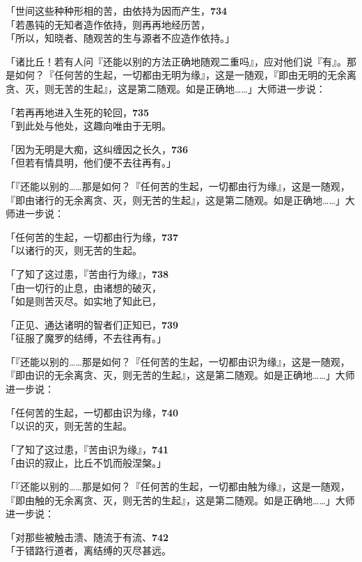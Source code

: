 「世间这些种种形相的苦，由依持为因而产生，\hfill{\grayfootnotesize \textbf{734}} \\
「若愚钝的无知者造作依持，则再再地经历苦，\\
「所以，知晓者、随观苦的生与源者不应造作依持。」


「诸比丘！若有人问『还能以别的方法正确地随观二重吗』，应对他们说『有』。那是如何？『任何苦的生起，一切都由无明为缘』，这是一随观，『即由无明的无余离贪、灭，则无苦的生起』，这是第二随观。如是正确地……」大师进一步说：


「若再再地进入生死的轮回，\hfill{\grayfootnotesize \textbf{735}} \\
「到此处与他处，这趣向唯由于无明。


「因为无明是大痴，这纠缠因之长久，\hfill{\grayfootnotesize \textbf{736}} \\
「但若有情具明，他们便不去往再有。」


「『还能以别的……那是如何？『任何苦的生起，一切都由行为缘』，这是一随观，『即由诸行的无余离贪、灭，则无苦的生起』，这是第二随观。如是正确地……」大师进一步说：


「任何苦的生起，一切都由行为缘，\hfill{\grayfootnotesize \textbf{737}} \\
「以诸行的灭，则无苦的生起。

「了知了这过患，『苦由行为缘』，\hfill{\grayfootnotesize \textbf{738}} \\
「由一切行的止息，由诸想的破灭，\\
「如是则苦灭尽。如实地了知此已，


「正见、通达诸明的智者们正知已，\hfill{\grayfootnotesize \textbf{739}} \\
「征服了魔罗的结缚，不去往再有。」


「『还能以别的……那是如何？『任何苦的生起，一切都由识为缘』，这是一随观，『即由识的无余离贪、灭，则无苦的生起』，这是第二随观。如是正确地……」大师进一步说：


「任何苦的生起，一切都由识为缘，\hfill{\grayfootnotesize \textbf{740}} \\
「以识的灭，则无苦的生起。

「了知了这过患，『苦由识为缘』，\hfill{\grayfootnotesize \textbf{741}} \\
「由识的寂止，比丘不饥而般涅槃。」


「『还能以别的……那是如何？『任何苦的生起，一切都由触为缘』，这是一随观，『即由触的无余离贪、灭，则无苦的生起』，这是第二随观。如是正确地……」大师进一步说：


「对那些被触击溃、随流于有流、\hfill{\grayfootnotesize \textbf{742}} \\
「于错路行道者，离结缚的灭尽甚远。


